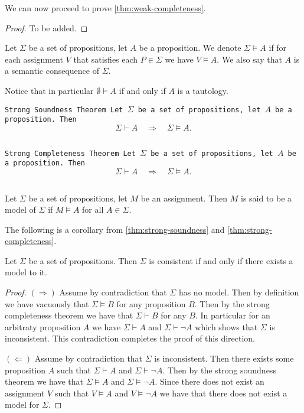 \documentclass[11pt,a4paper]{article}
\begin{document}
  We can now proceed to prove \autoref{thm:weak-completeness}.
  \begin{proof}
    To be added.
  \end{proof}

  \begin{definition}
    Let $\Sigma$ be a set of propositions, let $A$ be a proposition.
    We denote $\Sigma \models A$ if for each assignment $V$ that satisfies
    each $P \in \Sigma$ we have $V \models A$. We also say that $A$ is
    a semantic consequence of $\Sigma$.
  \end{definition}
  \begin{remark}
    Notice that in particular $\emptyset \models A$ if and only if $A$
    is a tautology.
  \end{remark}
  
  \begin{theorem}\label{thm:strong-soundness}\tt{Strong Soundness Theorem}
    Let $\Sigma$ be a set of propositions, let $A$ be a proposition.
    Then
    \[
      \Sigma \vdash A \quad\Rightarrow\quad \Sigma \models A.
    \]
  \end{theorem}

  \begin{theorem}\label{thm:strong-completeness}
    \tt{Strong Completeness Theorem}
    Let $\Sigma$ be a set of propositions, let $A$ be a proposition.
    Then
    \[
      \Sigma \vdash A \quad\Rightarrow\quad \Sigma \models A.
    \]
  \end{theorem}
  
  \begin{definition}[Model]
    Let $\Sigma$ be a set of propositions, let $M$ be an assignment.
    Then $M$ is said to be a model of $\Sigma$ if $M \models A$ 
    for all $A \in \Sigma$.
  \end{definition}

  The following is a corollary from \autoref{thm:strong-soundness}
  and \autoref{thm:strong-completeness}.
  \begin{corollary}
    Let $\Sigma$ be a set of propositions.
    Then $\Sigma$ is consistent if and only if there exists a model to it.
  \end{corollary}
  \begin{proof}
    $(\Rightarrow)$ Assume by contradiction that $\Sigma$ has no model.
    Then by definition we have vacuously that $\Sigma \models B$ for
    any proposition $B$. Then by the strong completeness theorem we have
    that $\Sigma \vdash B$ for any $B$. In particular for an arbitraty
    proposition $A$ we have $\Sigma \vdash A$ and $\Sigma \vdash \neg A$
    which shows that $\Sigma$ is inconsistent. This contradiction completes
    the proof of this direction.

    $(\Leftarrow)$ Assume by contradiction that $\Sigma$ is inconsistent.
    Then there exists some proposition $A$ such that $\Sigma \vdash A$
    and $\Sigma \vdash \neg A$. Then by the strong soundness theorem
    we have that $\Sigma \models A$ and $\Sigma \models \neg A$.
    Since there does not exist an assignment $V$ such that $V \models A$
    and $V \models \neg A$ we have that there does not exist a model
    for $\Sigma$.
  \end{proof}
\end{document}
